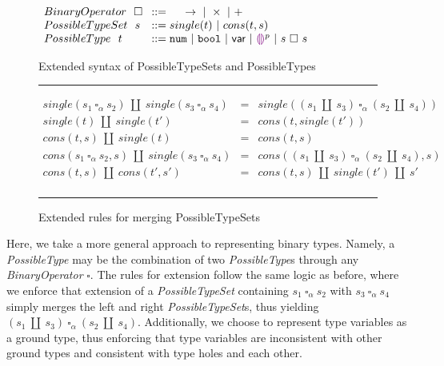 \begin{figure}[h!]
\centering
\vspace{-3px} 
$\arraycolsep=4pt\begin{array}{lll}
BinaryOperator~~ \square & ::=~~~~~
\rightarrow  ~\vert~ 
\times  ~\vert~ 
+
\\
PossibleTypeSet~~ s & ::= 
single(t) ~\vert~ 
cons(t, s)
\\
PossibleType~~ t & ::= 
  \tnum ~\vert~
  \tbool ~\vert~
  \TVar ~\vert~
  \ehole^p ~\vert~
  s ~\square~ s
  \\
\end{array}$
\label{fig:syntax_possible_type_sets}
\caption{Extended syntax of PossibleTypeSets and PossibleTypes}
\hrule
\[\begin{array}{rcl}
    single(s_1 ~\square_{\alpha}~ s_2) ~\amalg~ single(s_3 ~\square_{\alpha}~ s_4) & = & single((s_1 ~\amalg~ s_3) ~\square_{\alpha}~ (s_2 ~\amalg~ s_4)) \\
    single(t) ~\amalg~ single(t') & = & cons(t, single(t')) \\
    cons(t,s) ~\amalg~ single(t) & = & cons(t, s) \\
    cons(s_1 ~\square_{\alpha}~ s_2, s) ~\amalg~ single(s_3 ~\square_{\alpha}~ s_4) & = & cons((s_1 ~\amalg~ s_3) ~\square_{\alpha}~ (s_2 ~\amalg~ s_4), s) \\
    cons(t,s) ~\amalg~ cons(t',s') & = & cons(t,s) ~\amalg~ single(t') ~\amalg~ s' \\
\end{array}\] 
\caption{Extended rules for merging PossibleTypeSets}
\vspace{5px} 
\hrule
\label{fig:extended_merging_possible_type_sets}
\vspace{-5px}
\end{figure}
Here, we take a more general approach to representing binary types. Namely, a \emph{PossibleType} may be the combination of two \emph{PossibleType}s through any \emph{BinaryOperator} $\square$. The rules for extension follow the same logic as before, where we enforce that extension of a \emph{PossibleTypeSet} containing $s_1 ~\square_{\alpha}~ s_2$ with $s_3 ~\square_{\alpha}~ s_4$ simply merges the left and right \emph{PossibleTypeSet}s, thus yielding $(s_1 ~\amalg~ s_3) ~\square_{\alpha}~ (s_2 ~\amalg~ s_4)$. Additionally, we choose to represent type variables as a ground type, thus enforcing that type variables are inconsistent with other ground types and consistent with type holes and each other. 

